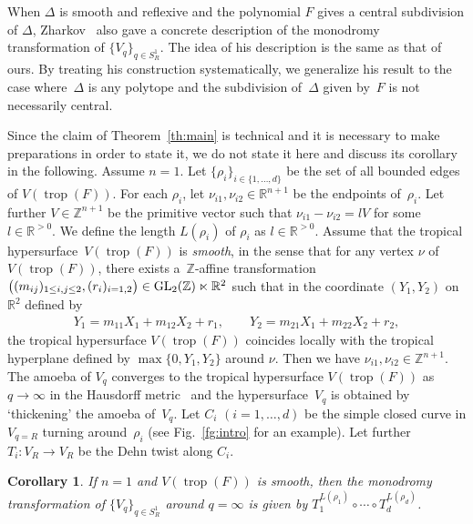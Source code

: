 \documentclass[pdftex]{sigma}
\numberwithin{equation}{section}
\newtheorem{Corollary}[Theorem]{Corollary}
\begin{document}
When $\Delta$ is smooth and ref\/lexive and the polynomial $F$ gives a central subdivision of $\Delta$, Zharkov~\cite{MR1738179} also gave a concrete description of the monodromy transformation of $\{V_q\}_{q \in S_R^1}$. The idea of his description is the same as that of ours. By treating his construction systematically, we generalize his result to the case where~$\Delta$ is any polytope and the subdivision of~$\Delta$ given by~$F$ is not necessarily central.

Since the claim of Theorem~\ref{th:main} is technical and it is necessary to make preparations in order to state it, we do not state it here and discuss its corollary in the following. Assume $n=1$. Let $\{\rho_i \}_{i \in \{1, \dots, d\}}$ be the set of all bounded edges of $V(\operatorname{trop}(F))$.
For each $\rho_i$, let $\nu_{i1}, \nu_{i2} \in {\mathbb R}^{n+1}$ be the endpoints of~$\rho_i$. Let further $V \in {\mathbb Z}^{n+1}$ be the primitive vector such that $\nu_{i1}-\nu_{i2}=lV$ for some $l \in {\mathbb R}^{>0}$. We def\/ine the length $L(\rho_i)$ of $\rho_i$ as $l \in {\mathbb R}^{>0}$. Assume that the tropical hypersur\-face~$V(\operatorname{trop}(F))$ is \textit{smooth}, in the sense that for any vertex $\nu$ of $V(\operatorname{trop}(F))$, there exists a~${\mathbb Z}$-af\/f\/ine transformation $\big((m_{ij})_{1 \leq i,j \leq 2}, (r_i)_{i=1,2} \big) \in {\rm GL}_2({\mathbb Z}) \ltimes {\mathbb R}^2$ such that in the coordinate $(Y_1, Y_2)$ on~${\mathbb R}^2$ def\/ined by
\begin{gather*}
Y_1=m_{11}X_1+m_{12}X_2+r_1, \qquad Y_2=m_{21}X_1+m_{22}X_2+r_2,
\end{gather*}
the tropical hypersurface $V(\operatorname{trop}(F))$ coincides locally with the tropical hyperplane def\/ined by $\max \{0, Y_1, Y_2 \}$ around $\nu$.
Then we have $\nu_{i1}, \nu_{i2} \in {\mathbb Z}^{n+1}$. The amoeba of $V_q$ converges to the tropical hypersurface $V(\operatorname{trop}(F))$ as $q \to \infty$ in the Hausdorf\/f metric~\cite{MR2079993, ISSN:1401-5617} and the hypersurface~$V_q$ is obtained by `thickening' the amoeba of~$V_q$. Let $C_i$ $(i=1, \dots, d)$ be the simple closed curve in $V_{q=R}$ turning around~$\rho_i$ (see Fig.~\ref{fg:intro} for an example).
Let further $T_{i} \colon V_R \to V_R$ be the Dehn twist along $C_i$.

\begin{Corollary}\label{cr:iwa} If $n=1$ and $V(\operatorname{trop}(F))$ is smooth, then the monodromy transformation of $\{V_q\}_{q \in S_R^1}$ around $q=\infty$ is given by $T_{1}^{L(\rho_1)} \circ \cdots \circ T_{d}^{L(\rho_d)}$.
\end{Corollary}
\end{document}
